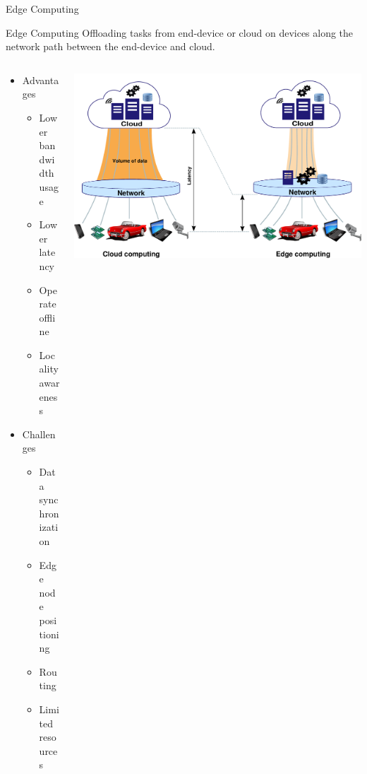 \documentclass[10pt,xcolor={dvipsnames}]{beamer}
\begin{document}
\begin{frame}{Edge Computing}{}
\begin{block}{Edge Computing}
Offloading tasks from end-device or cloud on devices along the network path between the end-device and cloud.
\end{block}
\begin{columns}
    \begin{column}{0.38\textwidth}
        \begin{itemize}
            \item<2-> Advantages
            \begin{itemize}
                \item<2-> Lower bandwidth usage
                \item<2-> Lower latency
                \item<2-> Operate offline
                \item<2-> Locality awareness
            \end{itemize}
        \end{itemize}
        \begin{itemize}
            \item<3-> Challenges
            \begin{itemize}
                \item<3-> Data synchronization
                \item<3-> Edge node positioning
                \item<3-> Routing
                \item<3-> Limited resources
            \end{itemize}
        \end{itemize}
    \end{column}
    \begin{column}{0.72\textwidth}
        \includegraphics[width=\textwidth]{img/edge-arch.pdf}
    \end{column}
\end{columns}

\end{frame}
\end{document}
